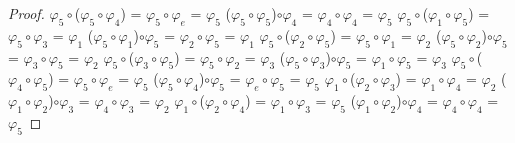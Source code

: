 \documentclass[10pt,a4paper,oneside]{article}
\begin{document}
\begin{proof}
					$\varphi_{5}\circ$($\varphi_{5}\circ\varphi_{4}$) = $\varphi_{5}\circ\varphi_{e}$ = $\varphi_{5}$
					\newline
					($\varphi_{5}\circ\varphi_{5}$)$\circ\varphi_{4}$ = $\varphi_{4}\circ\varphi_{4}$ = $\varphi_{5}$
					\newline
					\newline
					$\varphi_{5}\circ$($\varphi_{1}\circ\varphi_{5}$) = $\varphi_{5}\circ\varphi_{3}$ = $\varphi_{1}$
					\newline
					($\varphi_{5}\circ\varphi_{1}$)$\circ\varphi_{5}$ = $\varphi_{2}\circ\varphi_{5}$ = $\varphi_{1}$
					\newline
					\newline
					$\varphi_{5}\circ$($\varphi_{2}\circ\varphi_{5}$) = $\varphi_{5}\circ\varphi_{1}$ = $\varphi_{2}$
					\newline
					($\varphi_{5}\circ\varphi_{2}$)$\circ\varphi_{5}$ = $\varphi_{3}\circ\varphi_{5}$ = $\varphi_{2}$
					\newline
					\newline
					$\varphi_{5}\circ$($\varphi_{3}\circ\varphi_{5}$) = $\varphi_{5}\circ\varphi_{2}$ = $\varphi_{3}$
					\newline
					($\varphi_{5}\circ\varphi_{3}$)$\circ\varphi_{5}$ = $\varphi_{1}\circ\varphi_{5}$ = $\varphi_{3}$
					\newline
					\newline
					$\varphi_{5}\circ$($\varphi_{4}\circ\varphi_{5}$) = $\varphi_{5}\circ\varphi_{e}$ = $\varphi_{5}$
					\newline
					($\varphi_{5}\circ\varphi_{4}$)$\circ\varphi_{5}$ = $\varphi_{e}\circ\varphi_{5}$ = $\varphi_{5}$
					\newline
					\newline
					$\varphi_{1}\circ$($\varphi_{2}\circ\varphi_{3}$) = $\varphi_{1}\circ\varphi_{4}$ = $\varphi_{2}$
					\newline
					($\varphi_{1}\circ\varphi_{2}$)$\circ\varphi_{3}$ = $\varphi_{4}\circ\varphi_{3}$ = $\varphi_{2}$
					\newline
					\newline
					$\varphi_{1}\circ$($\varphi_{2}\circ\varphi_{4}$) = $\varphi_{1}\circ\varphi_{3}$ = $\varphi_{5}$
					\newline
					($\varphi_{1}\circ\varphi_{2}$)$\circ\varphi_{4}$ = $\varphi_{4}\circ\varphi_{4}$ = $\varphi_{5}$
					\newline
					\newline

\end{proof}
\end{document}
